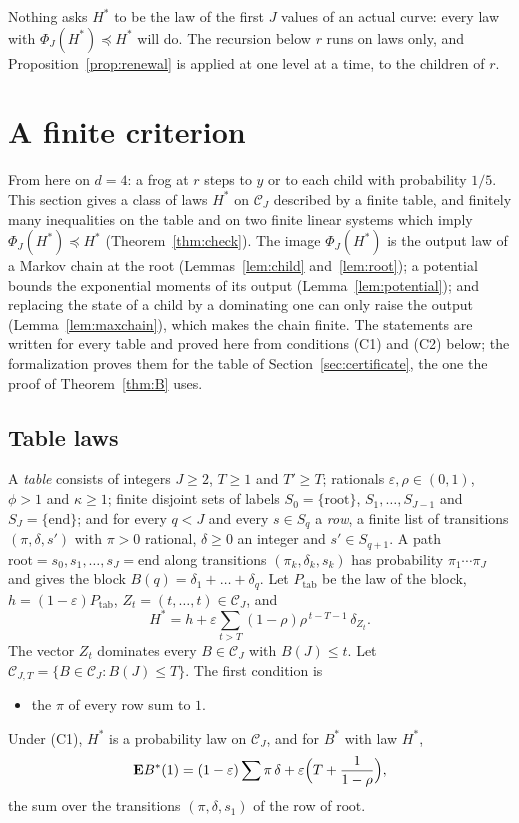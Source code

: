 \documentclass[11pt]{amsart}
\theoremstyle{definition}
\numberwithin{equation}{section}
\newcommand{\E}{\mathbf{E}}
\newcommand{\cC}{\mathcal{C}}
\newcommand{\eps}{\varepsilon}
\newcommand{\stle}{\preceq}
\begin{document}
Nothing asks $H^*$ to be the law of the first $J$ values of an actual curve: every law with $\Phi_J(H^*)\stle H^*$ will do. The recursion below $r$ runs on laws only, and Proposition~\ref{prop:renewal} is applied at one level at a time, to the children of $r$.

\section{A finite criterion}\label{sec:criterion}

From here on $d=4$: a frog at $r$ steps to $y$ or to each child with probability $1/5$. This section gives a class of laws $H^*$ on $\cC_J$ described by a finite table, and finitely many inequalities on the table and on two finite linear systems which imply $\Phi_J(H^*)\stle H^*$ (Theorem~\ref{thm:check}). The image $\Phi_J(H^*)$ is the output law of a Markov chain at the root (Lemmas~\ref{lem:child} and~\ref{lem:root}); a potential bounds the exponential moments of its output (Lemma~\ref{lem:potential}); and replacing the state of a child by a dominating one can only raise the output (Lemma~\ref{lem:maxchain}), which makes the chain finite. The statements are written for every table and proved here from conditions (C1) and (C2) below; the formalization proves them for the table of Section~\ref{sec:certificate}, the one the proof of Theorem~\ref{thm:B} uses.

\subsection{Table laws}\label{sec:table}
A \emph{table} consists of integers $J\ge2$, $T\ge1$ and $T'\ge T$; rationals $\eps,\rho\in(0,1)$, $\phi>1$ and $\kappa\ge1$; finite disjoint sets of labels $S_0=\{\mathrm{root}\}$, $S_1,\dots,S_{J-1}$ and $S_J=\{\mathrm{end}\}$; and for every $q<J$ and every $s\in S_q$ a \emph{row}, a finite list of transitions $(\pi,\delta,s')$ with $\pi>0$ rational, $\delta\ge0$ an integer and $s'\in S_{q+1}$. A path $\mathrm{root}=s_0,s_1,\dots,s_J=\mathrm{end}$ along transitions $(\pi_k,\delta_k,s_k)$ has probability $\pi_1\cdots\pi_J$ and gives the block $B(q)=\delta_1+\dots+\delta_q$. Let $P_{\mathrm{tab}}$ be the law of the block, $h=(1-\eps)P_{\mathrm{tab}}$, $Z_t=(t,\dots,t)\in\cC_J$, and
\[
H^*=h+\eps\sum_{t>T}(1-\rho)\rho^{\,t-T-1}\,\delta_{Z_t}.
\]
The vector $Z_t$ dominates every $B\in\cC_J$ with $B(J)\le t$. Let $\cC_{J,T}=\{B\in\cC_J:B(J)\le T\}$. The first condition is
\begin{itemize}
\item[(C1)] the $\pi$ of every row sum to $1$.
\end{itemize}
Under (C1), $H^*$ is a probability law on $\cC_J$, and for $B^*$ with law $H^*$,
\begin{equation}\label{eq:EB1}
\E B^*(1)=(1-\eps)\sum\pi\,\delta+\eps\Bigl(T+\frac{1}{1-\rho}\Bigr),
\end{equation}
the sum over the transitions $(\pi,\delta,s_1)$ of the row of $\mathrm{root}$.
\end{document}
